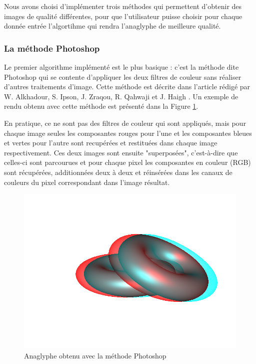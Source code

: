 	Nous avons choisi d'implémenter trois méthodes qui permettent d'obtenir des images de qualité différentes, pour que l'utilisateur puisse choisir pour chaque donnée entrée l'algortihme qui rendra l'anaglyphe de meilleure qualité. %
	  
\subsubsection{La méthode Photoshop}
	Le premier algorithme implémenté est le plus basique : c'est la méthode dite Photoshop qui se contente d'appliquer les deux filtres de couleur sans réaliser d'autres traitements d'image. Cette méthode est décrite dans l'article rédigé par W. Alkhadour, S. Ipson, J. Zraqou, R. Qahwaji et J. Haigh \cite{steteroAnaglyph}. Un exemple de rendu obtenu avec cette méthode est présenté dans la Figure \ref{fig:photoshop}.
		
	En pratique, ce ne sont pas des filtres de couleur qui sont appliqués, mais pour chaque image seules les composantes rouges pour l'une et les composantes bleues et vertes pour l'autre sont recupérées et restituées dans chaque image respectivement. Ces deux images sont ensuite "superposées", c'est-à-dire que celles-ci sont parcourues et pour chaque pixel les composantes en couleur (RGB) sont récupérées, additionnées deux à deux et réinsérées dans les canaux de couleurs du pixel correspondant dans l'image résultat. %
	
\begin{figure}[h]
	\centering
	\includegraphics[scale=0.3]{photoshop.png}
	\caption{\label{fig:photoshop} Anaglyphe obtenu avec la méthode Photoshop \protect}
\end{figure}
		
